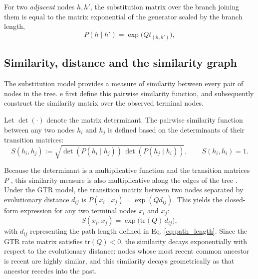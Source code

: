 For two \emph{adjacent} nodes $h,h'$, the substitution matrix over the branch joining them is equal to the matrix exponential of the generator scaled by the branch length,
\begin{equation}\label{eq:transition_matrix}
P(h \mid h') = \exp\bigl(Q t_{(h,h')}\bigr),
\end{equation}

\subsection{Similarity, distance and the similarity graph}\label{sec:bg-similarity}

The substitution model provides a measure of similarity between every pair of nodes in the tree. e first define this pairwise similarity function, and subsequently construct the similarity matrix over the observed terminal nodes.

\begin{definition}\label{def:similarity}
Let $\det(\cdot)$ denote the matrix determinant. The pairwise similarity function between any two nodes $h_i$ and $h_j$ is defined based on the determinants of their transition matrices:
\begin{equation}\label{eq:similarity_def}
   S(h_i, h_j) := \sqrt{\det(P(h_i \mid h_j))\,\det(P(h_j \mid h_i))},
   \qquad S(h_i,h_i) = 1 .
\end{equation}
\end{definition}

Because the determinant is a multiplicative function and the transition matrices $P$ , this similarity measure is also multiplicative along the edges of the tree \cite{aizenbud2023spectral}. Under  the GTR model, the transition matrix between two nodes separated by evolutionary distance $d_{ij}$ is $P(x_i \mid x_j) = \exp(Q d_{ij})$. This yields the closed-form expression for any two terminal nodes $x_i$ and $x_j$:
\begin{equation}\label{eq:similarity_gtr}
   S(x_i,x_j) = \exp\bigl(\mathrm{tr}(Q)\,d_{ij}\bigr),
\end{equation}
with $d_{ij}$ representing the path length defined in Eq. \eqref{eq:path_length}. Since the GTR rate matrix satisfies $\mathrm{tr}(Q)<0$, the similarity decays exponentially with respect to the evolutionary distance: nodes whose most recent common ancestor is recent are highly similar, and this similarity decays geometrically as that ancestor recedes into the past.

